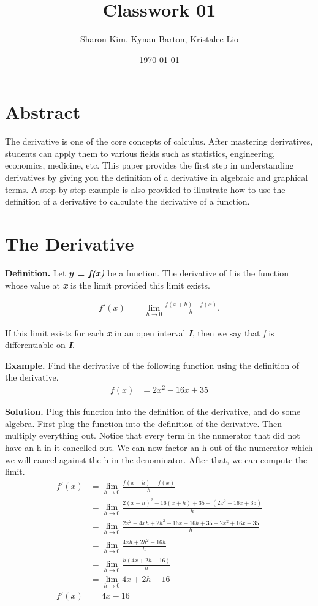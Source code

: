 \documentclass[aps,pra,notitlepage,amsmath,amssymb,letterpaper,12pt]{revtex4-1}
\begin{document}
 
\title{Classwork 01}
\author{Sharon Kim, Kynan Barton, Kristalee Lio}
\date{\today}

\maketitle
\section{Abstract}
\noindent The derivative is one of the core concepts of calculus. After mastering derivatives, students can apply them to various fields such as statistics, engineering, economics, medicine, etc. This paper provides the first step in understanding derivatives by giving you the definition of a derivative in algebraic and graphical terms. A step by step example is also provided to illustrate how to use the definition of a derivative to calculate the derivative of a function.

\section{The Derivative}

\noindent \textbf{Definition.}
Let \textbf{\textit{y = f(x)}} be a function. The derivative of f is the function whose value at \textbf{\textit{x}} is the limit provided this limit exists.

\begin{align*}
f'(x) &= \lim_{h \to 0} \frac{f(x+h)-f(x)}{h}.
\end{align*}

\noindent If this limit exists for each \textbf{\textit{x}} in an open interval \textbf{\textit{I}}, then we say that \textit{f} is differentiable on \textbf{\textit{I}}.

\bigskip
\noindent \textbf{Example.}
Find the derivative of the following function using the definition of the derivative.
\begin{align*}
f(x) &= 2x^2-16x+35
\end{align*}

\noindent \textbf{Solution.}
Plug this function into the definition of the derivative, and do some algebra. First plug the function into the definition of the derivative. Then multiply everything out. Notice that every term in the numerator that did not have an h in it cancelled out. We can now factor an h out of the numerator which we will cancel against the h in the denominator. After that, we can compute the limit.
\begin{align*}
f'(x) &= \lim_{h \to 0} \frac{f(x+h)-f(x)}{h} \\
&= \lim_{h \to 0} \frac{2(x+h)^2 -16(x+h) +35 -(2x^2-16x+35)}{h} \\
&= \lim_{h \to 0} \frac{2x^2 +4xh +2h^2 -16x -16h +35 -2x^2+16x-35}{h}\\
&= \lim_{h \to 0} \frac{4xh +2h^2 -16h}{h} \\
&= \lim_{h \to 0} \frac{h(4x+2h-16)}{h} \\
&= \lim_{h \to 0} 4x+2h-16 \\
f'(x) &= 4x-16
\end{align*}
\end{document}
